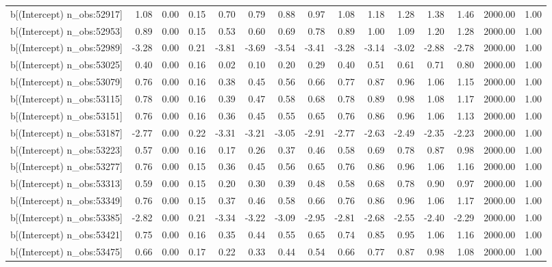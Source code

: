 \begin{table}[ht]
\begin{tabular}{rrrrrrrrrrrrrrr}
  b[(Intercept) n\_obs:52917] & 1.08 & 0.00 & 0.15 & 0.70 & 0.79 & 0.88 & 0.97 & 1.08 & 1.18 & 1.28 & 1.38 & 1.46 & 2000.00 & 1.00 \\ 
  b[(Intercept) n\_obs:52953] & 0.89 & 0.00 & 0.15 & 0.53 & 0.60 & 0.69 & 0.78 & 0.89 & 1.00 & 1.09 & 1.20 & 1.28 & 2000.00 & 1.00 \\ 
  b[(Intercept) n\_obs:52989] & -3.28 & 0.00 & 0.21 & -3.81 & -3.69 & -3.54 & -3.41 & -3.28 & -3.14 & -3.02 & -2.88 & -2.78 & 2000.00 & 1.00 \\ 
  b[(Intercept) n\_obs:53025] & 0.40 & 0.00 & 0.16 & 0.02 & 0.10 & 0.20 & 0.29 & 0.40 & 0.51 & 0.61 & 0.71 & 0.80 & 2000.00 & 1.00 \\ 
  b[(Intercept) n\_obs:53079] & 0.76 & 0.00 & 0.16 & 0.38 & 0.45 & 0.56 & 0.66 & 0.77 & 0.87 & 0.96 & 1.06 & 1.15 & 2000.00 & 1.00 \\ 
  b[(Intercept) n\_obs:53115] & 0.78 & 0.00 & 0.16 & 0.39 & 0.47 & 0.58 & 0.68 & 0.78 & 0.89 & 0.98 & 1.08 & 1.17 & 2000.00 & 1.00 \\ 
  b[(Intercept) n\_obs:53151] & 0.76 & 0.00 & 0.16 & 0.36 & 0.45 & 0.55 & 0.65 & 0.76 & 0.86 & 0.96 & 1.06 & 1.13 & 2000.00 & 1.00 \\ 
  b[(Intercept) n\_obs:53187] & -2.77 & 0.00 & 0.22 & -3.31 & -3.21 & -3.05 & -2.91 & -2.77 & -2.63 & -2.49 & -2.35 & -2.23 & 2000.00 & 1.00 \\ 
  b[(Intercept) n\_obs:53223] & 0.57 & 0.00 & 0.16 & 0.17 & 0.26 & 0.37 & 0.46 & 0.58 & 0.69 & 0.78 & 0.87 & 0.98 & 2000.00 & 1.00 \\ 
  b[(Intercept) n\_obs:53277] & 0.76 & 0.00 & 0.15 & 0.36 & 0.45 & 0.56 & 0.65 & 0.76 & 0.86 & 0.96 & 1.06 & 1.16 & 2000.00 & 1.00 \\ 
  b[(Intercept) n\_obs:53313] & 0.59 & 0.00 & 0.15 & 0.20 & 0.30 & 0.39 & 0.48 & 0.58 & 0.68 & 0.78 & 0.90 & 0.97 & 2000.00 & 1.00 \\ 
  b[(Intercept) n\_obs:53349] & 0.76 & 0.00 & 0.15 & 0.37 & 0.46 & 0.58 & 0.66 & 0.76 & 0.86 & 0.96 & 1.06 & 1.17 & 2000.00 & 1.00 \\ 
  b[(Intercept) n\_obs:53385] & -2.82 & 0.00 & 0.21 & -3.34 & -3.22 & -3.09 & -2.95 & -2.81 & -2.68 & -2.55 & -2.40 & -2.29 & 2000.00 & 1.00 \\ 
  b[(Intercept) n\_obs:53421] & 0.75 & 0.00 & 0.16 & 0.35 & 0.44 & 0.55 & 0.65 & 0.74 & 0.85 & 0.95 & 1.06 & 1.16 & 2000.00 & 1.00 \\ 
  b[(Intercept) n\_obs:53475] & 0.66 & 0.00 & 0.17 & 0.22 & 0.33 & 0.44 & 0.54 & 0.66 & 0.77 & 0.87 & 0.98 & 1.08 & 2000.00 & 1.00 \\ 

\end{tabular}
\end{table}

